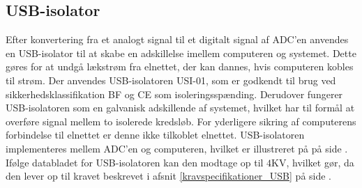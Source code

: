 \subsection{USB-isolator}
Efter konvertering fra et analogt signal til et digitalt signal af ADC'en anvendes en USB-isolator til at skabe en adskillelse imellem computeren og systemet. Dette gøres for at undgå lækstrøm fra elnettet, der kan dannes, hvis computeren kobles til strøm. Der anvendes USB-isolatoren USI-01, som er godkendt til brug ved sikkerhedsklassifikation BF og CE som isoleringsspænding. Derudover fungerer USB-isolatoren som en galvanisk adskillende af systemet, hvilket har til formål at overføre signal mellem to isolerede kredsløb. For yderligere sikring af computerens forbindelse til elnettet er denne ikke tilkoblet elnettet. USB-isolatoren implementeres mellem ADC'en og computeren, hvilket er illustreret på  på side \pageref{kravblok}. \\
Ifølge databladet for USB-isolatoren kan den modtage op til $4$KV, hvilket gør, da den lever op til kravet beskrevet i afsnit \ref{kravspecifikationer_USB} på side \pageref{kravspecifikationer_USB}.
%
